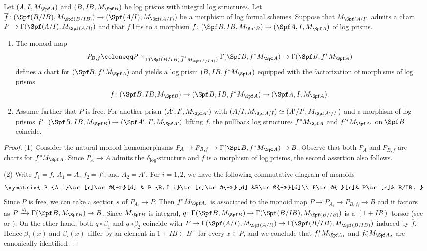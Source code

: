 \begin{cor}\label{cor: chart of lifts}
Let $(A,I,M_{\Spf A})$ and $(B,IB,M_{\Spf B})$ be log prisms with integral log structures. Let $\overline{f}\colon(\Spf(B/IB),M_{\Spf(B/IB)}) \to (\Spf(A/I),M_{\Spf(A/I)})$ be a morphism of log formal schemes. Suppose that $M_{\Spf(A/I)}$ admits a chart $P\to \Gamma(\Spf(A/I),M_{\Spf(A/I)})$ and that $\overline{f}$ lifts to a morphism  $f\colon (\Spf B,IB,M_{\Spf B}) \to (\Spf A,I,M_{\Spf A})$ of log prisms.
\begin{enumerate}
\item The monoid map
\[
P_{B,f}\coloneqq P\times_{\Gamma(\Spf(B/IB),\overline{f}^\ast M_{\Spf(A/IA)})}\Gamma(\Spf B,{f}^\ast M_{\Spf A}) \to \Gamma(\Spf B,{f}^\ast M_{\Spf A})
\]
defines a chart for $(\Spf B, f^\ast M_{\Spf A})$ and yields a log prism $(B,IB,f^\ast M_{\Spf A})$ equipped with the factorization of morphisms of log prisms
\[
f\colon (\Spf B,IB,M_{\Spf B}) \rightarrow (\Spf B,IB,f^\ast M_{\Spf A})\rightarrow (\Spf A,I,M_{\Spf A}). 
\]
\item Assume further that $P$ is free. For another prism $(A',I',M_{\Spf A'})$ with $(A/I,M_{\Spf A/I}) \simeq (A'/I',M_{\Spf A'/I'})$ and a morphism of log prisms $f'\colon (\Spf B,IB,M_{\Spf B}) \to (\Spf A',I',M_{\Spf A'})$ lifting $\overline{f}$, 
the pullback log structures $f^\ast M_{\Spf A}$ and $f'^\ast M_{\Spf A'}$ on $\Spf B$ coincide.
\end{enumerate}
\end{cor}

\begin{proof}
(1) Consider the natural monoid homomorphisms $P_A\rightarrow P_{B,f}\rightarrow \Gamma(\Spf B,{f}^\ast M_{\Spf A})\rightarrow B$. Observe that both $P_A$ and $P_{B,f}$ are charts for $f^\ast M_{\Spf A}$. Since $P_A\rightarrow A$ admits the $\delta_\log$-structure and $f$ is a morphism of log prisms, the second assertion also follows.

(2) Write $f_1=f$, $A_1=A$, $f_2=f'$, and $A_2=A'$. For $i=1,2$, we have the following commutative diagram of monoids
\[
\xymatrix{
P_{A_i}\ar[r]\ar@{->>}[d] & P_{B,f_i}\ar[r]\ar@{->>}[d] &B\ar@{->>}[d]\\
P\ar@{=}[r]& P\ar[r]& B/IB.
}
\]
Since $P$ is free, we can take a section $s$ of $P_{A_i}\rightarrow P$. Then $f^\ast M_{\Spf A_i}$ is associated to the monoid map $P\rightarrow P_{A_i}\rightarrow P_{B,f_i}\rightarrow B$ and it factors as $P\xrightarrow{\beta_i} \Gamma(\Spf B,M_{\Spf B})\rightarrow B$. Since $M_{\Spf B}$ is integral, $q\colon \Gamma(\Spf B,M_{\Spf B})\rightarrow \Gamma(\Spf (B/IB),M_{\Spf (B/IB)})$ is a $(1+IB)$-torsor (see \cite[p.3, Ex.~(iii)]{Beilinson-crystalline-period-map} or \cite[Prop.~IV.2.1.2.]{Ogus-log}). On the other hand, both $q\circ \beta_1$ and $q\circ \beta_2$ coincide with $P\rightarrow  \Gamma(\Spf(A/I),M_{\Spf(A/I)})\rightarrow\Gamma(\Spf (B/IB),M_{\Spf (B/IB)})$ induced by $\overline{f}$. Hence $\beta_1(x)$ and $\beta_2(x)$ differ by an element in $1+IB\subset B^\times$ for every $x\in P$, and we conclude that $f_1^\ast M_{\Spf A_1}$ and $f_2^\ast M_{\Spf A_2}$ are canonically identified.
\end{proof}

